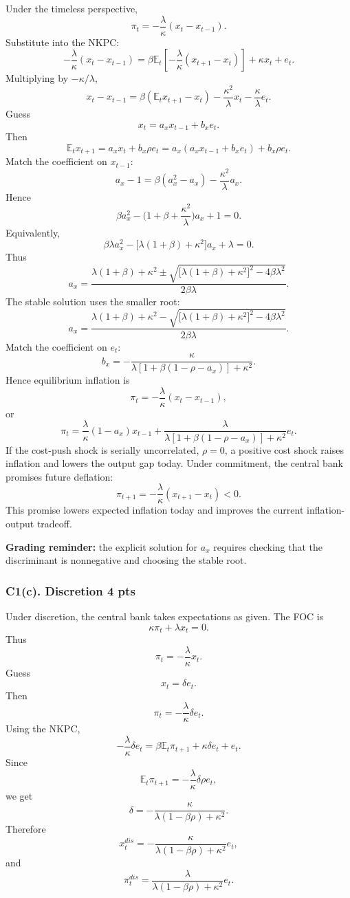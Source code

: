 \documentclass[11pt]{article}
\begin{document}
Under the timeless perspective,
\[
\pi_t=-\frac{\lambda}{\kappa}(x_t-x_{t-1}).
\]
Substitute into the NKPC:
\[
-\frac{\lambda}{\kappa}(x_t-x_{t-1})
=
\beta \mathbb{E}_t\left[-\frac{\lambda}{\kappa}(x_{t+1}-x_t)\right]
+\kappa x_t+e_t.
\]
Multiplying by \(-\kappa/\lambda\),
\[
x_t-x_{t-1}
=
\beta(\mathbb{E}_tx_{t+1}-x_t)
-\frac{\kappa^2}{\lambda}x_t
-\frac{\kappa}{\lambda}e_t.
\]
Guess
\[
x_t=a_xx_{t-1}+b_xe_t.
\]
Then
\[
\mathbb{E}_tx_{t+1}=a_xx_t+b_x\rho e_t
=a_x(a_xx_{t-1}+b_xe_t)+b_x\rho e_t.
\]
Match the coefficient on \(x_{t-1}\):
\[
a_x-1
=
\beta(a_x^2-a_x)-\frac{\kappa^2}{\lambda}a_x.
\]
Hence
\[
\beta a_x^2-\bigg(1+\beta+\frac{\kappa^2}{\lambda}\bigg)a_x+1=0.
\]
Equivalently,
\[
\beta\lambda a_x^2-\big[\lambda(1+\beta)+\kappa^2\big]a_x+\lambda=0.
\]
Thus
\[
a_x
=
\frac{
\lambda(1+\beta)+\kappa^2
\pm
\sqrt{\big[\lambda(1+\beta)+\kappa^2\big]^2-4\beta\lambda^2}
}{2\beta\lambda}.
\]
The stable solution uses the smaller root:
\[
a_x
=
\frac{
\lambda(1+\beta)+\kappa^2
-
\sqrt{\big[\lambda(1+\beta)+\kappa^2\big]^2-4\beta\lambda^2}
}{2\beta\lambda}.
\]
Match the coefficient on \(e_t\):
\[
b_x
=
-\frac{\kappa}{
\lambda[1+\beta(1-\rho-a_x)]+\kappa^2
}.
\]
Hence equilibrium inflation is
\[
\pi_t
=
-\frac{\lambda}{\kappa}(x_t-x_{t-1}),
\]
or
\[
\pi_t
=
\frac{\lambda}{\kappa}(1-a_x)x_{t-1}
+
\frac{\lambda}{
\lambda[1+\beta(1-\rho-a_x)]+\kappa^2
}e_t.
\]
If the cost-push shock is serially uncorrelated, \(\rho=0\), a positive cost shock raises inflation and lowers the output gap today. Under commitment, the central bank promises future deflation:
\[
\pi_{t+1}
=
-\frac{\lambda}{\kappa}(x_{t+1}-x_t)<0.
\]
This promise lowers expected inflation today and improves the current inflation-output tradeoff.

\textbf{Grading reminder:} the explicit solution for \(a_x\) requires checking that the discriminant is nonnegative and choosing the stable root.

\clearpage
\subsubsection*{C1(c). Discretion \hfill 4 pts}

Under discretion, the central bank takes expectations as given. The FOC is
\[
\kappa \pi_t+\lambda x_t=0.
\]
Thus
\[
\pi_t=-\frac{\lambda}{\kappa}x_t.
\]
Guess
\[
x_t=\delta e_t.
\]
Then
\[
\pi_t=-\frac{\lambda}{\kappa}\delta e_t.
\]
Using the NKPC,
\[
-\frac{\lambda}{\kappa}\delta e_t
=
\beta \mathbb{E}_t\pi_{t+1}
+\kappa\delta e_t+e_t.
\]
Since
\[
\mathbb{E}_t\pi_{t+1}
=
-\frac{\lambda}{\kappa}\delta \rho e_t,
\]
we get
\[
\delta
=
-\frac{\kappa}{
\lambda(1-\beta\rho)+\kappa^2
}.
\]
Therefore
\[
x_t^{dis}
=
-\frac{\kappa}{
\lambda(1-\beta\rho)+\kappa^2
}e_t,
\]
and
\[
\pi_t^{dis}
=
\frac{\lambda}{
\lambda(1-\beta\rho)+\kappa^2
}e_t.
\]
\end{document}
